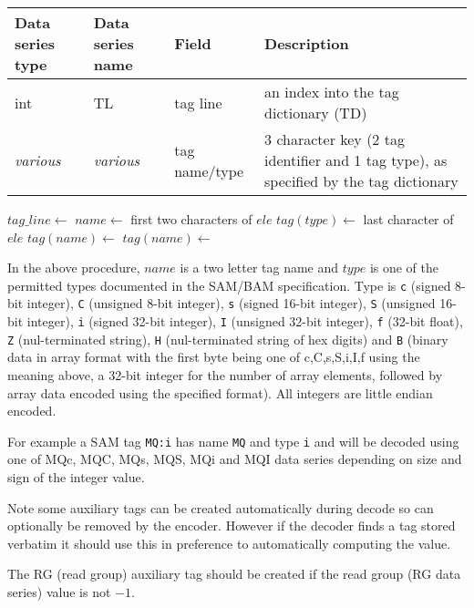 \documentclass[a4paper]{article}
\begin{document}
\begin{tabular}{|>{\raggedright}p{70pt}|>{\raggedright}p{75pt}|>{\raggedright}p{90pt}|>{\raggedright}p{200pt}|}
\hline
\textbf{Data series type} & \textbf{Data series name} & \textbf{Field} & \textbf{Description}\tabularnewline
\hline
int & TL & tag line & an index into the tag dictionary (TD)\tabularnewline
\hline
\textit{various} & \textit{various} & tag name/type & 3 character key (2 tag identifier and 1 tag type), as specified by the tag dictionary\tabularnewline
\hline
\end{tabular}

\vskip 20pt
\begin{algorithmic}[1]
\State $tag\_line\gets$ 
  \State $name\gets$ first two characters of $ele$
  \State $tag(type)\gets$ last character of $ele$
  \State $tag(name)\gets$ 
  \Else
  \State $tag(name)\gets$ 
  \EndIf
\EndFor
\EndProcedure
\end{algorithmic}

In the above procedure, $name$ is a two letter tag name and $type$ is one of the permitted types documented in the SAM/BAM specification.
Type is \texttt{c} (signed 8-bit integer), \texttt{C} (unsigned 8-bit integer), \texttt{s} (signed 16-bit integer), \texttt{S} (unsigned 16-bit integer), \texttt{i} (signed 32-bit integer), \texttt{I} (unsigned 32-bit integer), \texttt{f} (32-bit float), \texttt{Z} (nul-terminated string), \texttt{H} (nul-terminated string of hex digits) and \texttt{B} (binary data in array format with the first byte being one of c,C,s,S,i,I,f using the meaning above, a 32-bit integer for the number of array elements, followed by array data encoded using the specified format).  All integers are little endian encoded.

For example a SAM tag \texttt{MQ:i} has name \texttt{MQ} and type \texttt{i} and will be decoded using one of MQc, MQC, MQs, MQS, MQi and MQI data series depending on size and sign of the integer value.

Note some auxiliary tags can be created automatically during decode so can optionally be removed by the encoder.
However if the decoder finds a tag stored verbatim it should use this in preference to automatically computing the value.

The RG (read group) auxiliary tag should be created if the read group (RG data series) value is not $-1$.
\end{document}
